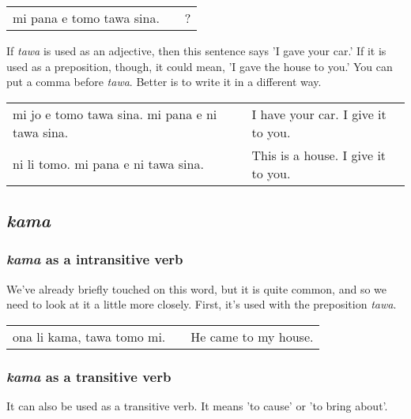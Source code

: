 \begin{supertabular}{p{5,5cm}|ll}
mi pana e tomo tawa sina. && ? \\   %
\end{supertabular} 

If \textit{tawa} is used as an adjective, then this sentence says 'I gave your car.' 
If it is used as a preposition, though, it could mean, 'I gave the house to you.' 
You can put a comma before \textit{tawa}. 
Better is to write it in a different way.

\begin{supertabular}{p{5,5cm}|ll}
mi jo e tomo tawa sina. mi pana e ni tawa sina. && I have your car. I give it to you. \\
ni li tomo. mi pana e ni tawa sina. && This is a house. I give it to you. \\
\end{supertabular} 

%
{}
\subsection*{\textit{kama}}
\subsubsection*{\textit{kama} as a intransitive verb}
%
We've already briefly touched on this word, but it is quite common, and so we need to look at it a little more closely. 
First, it's used with the preposition \textit{tawa}.

\begin{supertabular}{p{5,5cm}|ll}
ona li kama, tawa tomo mi. && He came to my house. \\
\end{supertabular} 
%
\subsubsection*{\textit{kama} as a transitive verb}
%
It can also be used as a transitive verb. 
It means 'to cause' or 'to bring about'.

